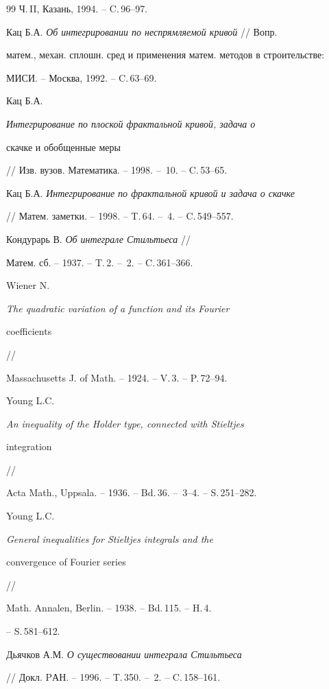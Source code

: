 \begin{thebibliography}{99}
Ч.\,II, Казань, 1994. -- C.\,96--97.




Кац Б.А. {\em Об интегрировании по неспрямляемой кривой} // Вопр.


матем., механ. сплошн. сред и применения матем. методов в строительстве:


МИСИ. -- Москва, 1992. -- C.\,63--69.




Кац Б.А. {\em Интегрирование по плоской фрактальной кривой, задача о


скачке и обобщенные меры}


// Изв. вузов. Математика. -- 1998. -- \No\,10. -- C.\,53--65.




Кац Б.А. {\em Интегрирование по фрактальной кривой и задача о скачке}


// Матем. заметки. -- 1998. -- T.\,64. -- \No\,4. -- C.\,549--557.




Кондурарь В. {\em Об интеграле Стильтьеса} //


Матем. сб. -- 1937. -- T.\,2. -- \No\,2. -- C.\,361--366.




Wiener N. {\em The quadratic variation of a function and its Fourier


coefficients} //


Massachusetts J. of Math. -- 1924. -- V.\,3. -- P.\,72--94.




Young L.C. {\em An inequality of the Holder type, connected with Stieltjes


integration} //


Acta Math., Uppsala. -- 1936. -- Bd.\,36. -- \No\,3--4. -- S.\,251--282.




Young L.C. {\em General inequalities for Stieltjes integrals and the


convergence of Fourier series} //


Math. Annalen, Berlin. -- 1938. -- Bd.\,115. -- H.\,4.


-- S.\,581--612.




Дьячков А.М. {\em О существовании интеграла Стильтьеса}


// Докл. PАН. -- 1996. -- T.\,350. -- \No\,2. -- C.\,158--161.



\end{thebibliography}
